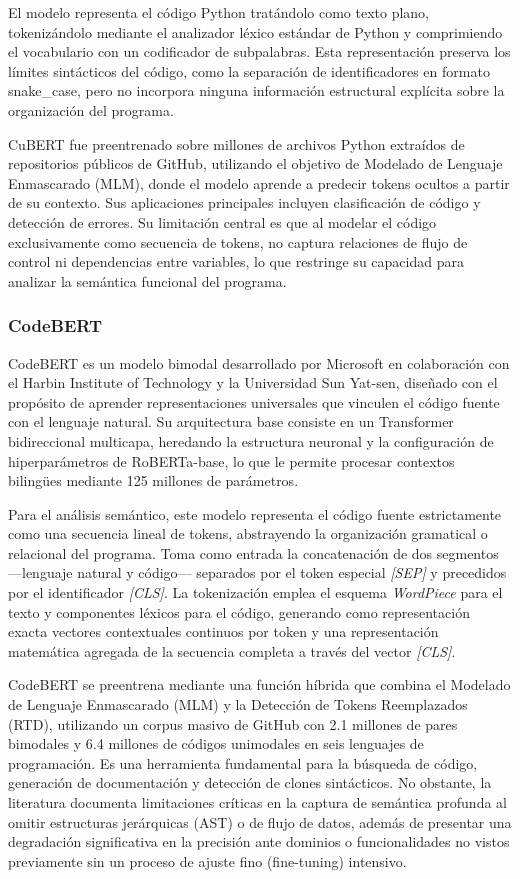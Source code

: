 El modelo representa el código Python tratándolo como texto plano, tokenizándolo 
mediante el analizador léxico estándar de Python y comprimiendo el vocabulario 
con un codificador de subpalabras. Esta representación preserva los límites 
sintácticos del código, como la separación de identificadores en formato 
snake\_case, pero no incorpora ninguna información estructural explícita sobre 
la organización del programa.

CuBERT fue preentrenado sobre millones de archivos Python extraídos de 
repositorios públicos de GitHub, utilizando el objetivo de Modelado de Lenguaje 
Enmascarado (MLM), donde el modelo aprende a predecir tokens ocultos a partir 
de su contexto. Sus aplicaciones principales incluyen clasificación de código y 
detección de errores. Su limitación central es que al modelar el código 
exclusivamente como secuencia de tokens, no captura relaciones de flujo de 
control ni dependencias entre variables, lo que restringe su capacidad para 
analizar la semántica funcional del programa.

\subsubsection{CodeBERT}

CodeBERT es un modelo bimodal desarrollado por Microsoft en colaboración con el Harbin Institute of Technology y la Universidad Sun Yat-sen, diseñado con el propósito de aprender representaciones universales que vinculen el código fuente con el lenguaje natural. Su arquitectura base consiste en un Transformer bidireccional multicapa, heredando la estructura neuronal y la configuración de hiperparámetros de RoBERTa-base, lo que le permite procesar contextos bilingües mediante 125 millones de parámetros.

Para el análisis semántico, este modelo representa el código fuente estrictamente como una secuencia lineal de tokens, abstrayendo la organización gramatical o relacional del programa. Toma como entrada la concatenación de dos segmentos —lenguaje natural y código— separados por el token especial \textit{[SEP]} y precedidos por el identificador \textit{[CLS]}. La tokenización emplea el esquema \textit{WordPiece} para el texto y componentes léxicos para el código, generando como representación exacta vectores contextuales continuos por token y una representación matemática agregada de la secuencia completa a través del vector \textit{[CLS]}.

CodeBERT se preentrena mediante una función híbrida que combina el Modelado de Lenguaje Enmascarado (MLM) y la Detección de Tokens Reemplazados (RTD), utilizando un corpus masivo de GitHub con 2.1 millones de pares bimodales y 6.4 millones de códigos unimodales en seis lenguajes de programación. Es una herramienta fundamental para la búsqueda de código, generación de documentación y detección de clones sintácticos. No obstante, la literatura documenta limitaciones críticas en la captura de semántica profunda al omitir estructuras jerárquicas (AST) o de flujo de datos, además de presentar una degradación significativa en la precisión ante dominios o funcionalidades no vistos previamente sin un proceso de ajuste fino (fine-tuning) intensivo.


